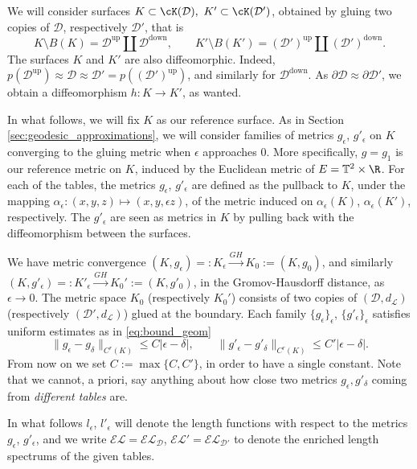 \documentclass[reqno,11pt]{amsart}
\begin{document}
\par We will consider surfaces \( K \subset \cK(\mathcal{D}), \ K' \subset \cK(\mathcal{D}') \), obtained by gluing two copies of \( \mathcal{D} \), respectively \( \mathcal{D}' \), that is  
\[
    K \setminus B(K) = \mathcal{D}^\mathrm{up} \coprod \mathcal{D}^\mathrm{down}, \qquad K' \setminus B(K') = (\mathcal{D}')^\mathrm{up} \coprod (\mathcal{D}')^\mathrm{down}.
\]  
The surfaces \( K \) and \( K' \) are also diffeomorphic. 
Indeed, \( p(\mathcal{D}^\mathrm{up}) \approx \mathcal{D} \approx \mathcal{D}' = p((\mathcal{D}')^\mathrm{up}) \), and similarly for \( \mathcal{D}^\mathrm{down} \).  
As \( \partial \mathcal{D} \approx \partial \mathcal{D}' \), we obtain a diffeomorphism \( h\colon K \to K' \), as wanted.  
\par In what follows, we will fix \( K \) as our reference surface.
As in Section \ref{sec:geodesic_approximations}, we will consider families of metrics \( g_\epsilon \), \( g'_\epsilon \) on \( K \) converging to the gluing metric when \( \epsilon \) approaches \( 0 \).  
More specifically, \( g = g_1 \) is our reference metric on \( K \), induced by the Euclidean metric of \( E = \mathbb{T}^2 \times \R \).  
For each of the tables, the metrics \( g_\epsilon \), \( g'_\epsilon \) are defined as the pullback to \( K \), under the mapping \(\alpha_\epsilon\colon (x,y,z) \mapsto (x,y,\epsilon z) \), of the metric induced on \(\alpha_\epsilon(K) \), \(\alpha_\epsilon(K') \), respectively.  
The \( g'_\epsilon \) are seen as metrics in \(K\) by pulling back with the diffeomorphism between the surfaces.
\par We have metric convergence \( (K, g_\epsilon) =: K_\epsilon \xrightarrow{GH} K_0 := (K, g_0) \), and similarly \( (K, g'_\epsilon) =: K'_\epsilon \xrightarrow{GH} K_0' := (K, g'_0) \), in the Gromov-Hausdorff distance, as \( \epsilon \to 0 \).  
The metric space \( K_0 \) (respectively \( K_0' \)) consists of two copies of \( (\mathcal{D}, d_\mathcal{L}) \) (respectively \( (\mathcal{D}', d_\mathcal{L}) \)) glued at the boundary.  
Each family \(\{g_\epsilon\}_\epsilon\), \(\{g'_\epsilon\}_\epsilon\) satisfies uniform estimates as in \eqref{eq:bound_geom}  
\[
    \|g_\epsilon - g_\delta\|_{C^r(K)} \leq  C|\epsilon - \delta|, \qquad 
    \|g'_\epsilon - g'_\delta\|_{C^r(K)} \leq  C'|\epsilon - \delta|.
\]
From now on we set \( C:= \max\{C, C'\} \), in order to have a single constant.  
Note that we cannot, a priori, say anything about how close two metrics \( g_\epsilon, g'_\delta \) coming from \emph{different tables} are.  
\par In what follows \( l_\epsilon \), \( l'_\epsilon \) will denote the length functions with respect to the metrics \( g_\epsilon \), \( g'_\epsilon \), and we write \( \mathcal{EL} = \mathcal{EL}_{\mathcal{D}} \), \( \mathcal{EL}' = \mathcal{EL}_{\mathcal{D}'} \) to denote the enriched length spectrums of the given tables.
\end{document}
